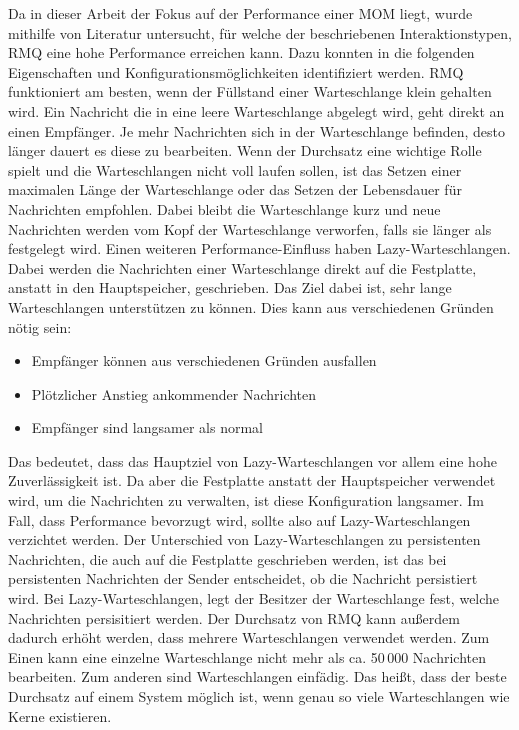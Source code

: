 Da in dieser Arbeit der Fokus auf der Performance einer MOM liegt, wurde mithilfe von Literatur untersucht, für welche der beschriebenen Interaktionstypen, RMQ eine hohe Performance erreichen kann. Dazu konnten in \cite{rabbitmq} die folgenden Eigenschaften und Konfigurationsmöglichkeiten identifiziert werden. RMQ funktioniert am besten, wenn der Füllstand einer Warteschlange klein gehalten wird. Ein Nachricht die in eine leere Warteschlange abgelegt wird, geht direkt an einen Empfänger. Je mehr Nachrichten sich in der Warteschlange befinden, desto länger dauert es diese zu bearbeiten. Wenn der Durchsatz eine wichtige Rolle spielt und die Warteschlangen nicht voll laufen sollen, ist das Setzen einer maximalen Länge der Warteschlange oder das Setzen der Lebensdauer für Nachrichten empfohlen. Dabei bleibt die Warteschlange kurz und neue Nachrichten werden vom Kopf der Warteschlange verworfen, falls sie länger als festgelegt wird. Einen weiteren Performance-Einfluss haben Lazy-Warteschlangen. Dabei werden die Nachrichten einer Warteschlange direkt auf die Festplatte, anstatt in den Hauptspeicher, geschrieben. Das Ziel dabei ist, sehr lange Warteschlangen unterstützen zu können. Dies kann aus verschiedenen Gründen nötig sein:
\begin{itemize}
    \item Empfänger können aus verschiedenen Gründen ausfallen
    \item Plötzlicher Anstieg ankommender Nachrichten
    \item Empfänger sind langsamer als normal
\end{itemize}
Das bedeutet, dass das Hauptziel von Lazy-Warteschlangen vor allem eine hohe Zuverlässigkeit ist. Da aber die Festplatte anstatt der Hauptspeicher verwendet wird, um die Nachrichten zu verwalten, ist diese Konfiguration langsamer. Im Fall, dass Performance bevorzugt wird, sollte also auf Lazy-Warteschlangen verzichtet werden. Der Unterschied von Lazy-Warteschlangen zu persistenten Nachrichten, die auch auf die Festplatte geschrieben werden, ist das bei persistenten Nachrichten der Sender entscheidet, ob die Nachricht persistiert wird. Bei Lazy-Warteschlangen, legt der Besitzer der Warteschlange fest, welche Nachrichten persisitiert werden. Der Durchsatz von RMQ kann außerdem dadurch erhöht werden, dass mehrere Warteschlangen verwendet werden. Zum Einen kann eine einzelne Warteschlange nicht mehr als ca. 50\,000 Nachrichten bearbeiten. Zum anderen sind Warteschlangen einfädig. Das heißt, dass der beste Durchsatz auf einem System möglich ist, wenn genau so viele Warteschlangen wie Kerne existieren. 

